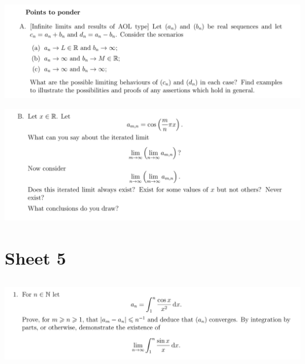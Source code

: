\documentclass[12pt]{article}
\begin{document}
\subsection{}
\begin{mdframed}
\includegraphics[width=400pt]{img/oxford-M2-analysis-I-extra-A.png}
\end{mdframed}
\begin{mdframed}
\includegraphics[width=400pt]{img/oxford-M2-analysis-I-extra-B.png}
\end{mdframed}

\newpage
\section{Sheet 5}

\newpage
\subsection{}

\begin{mdframed}
\includegraphics[width=400pt]{img/analysis--oxford-M2-I-5-1.png}
\end{mdframed}

\end{document}
